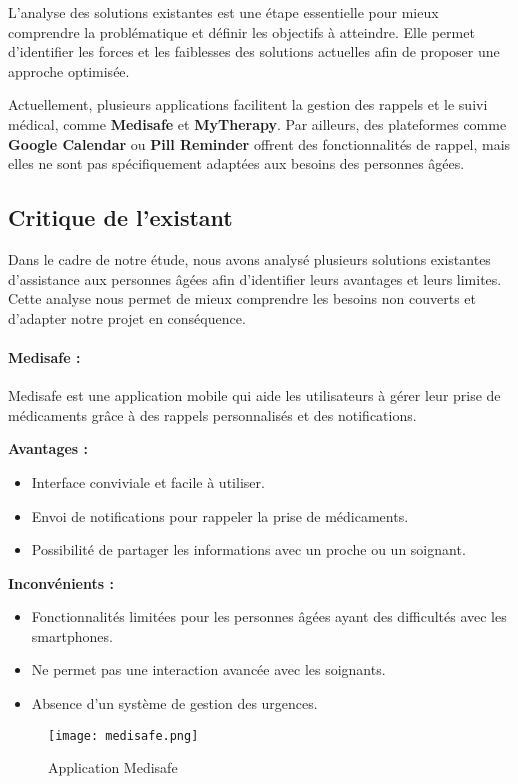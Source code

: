 \documentclass[12pt,a4paper]{report}
\begin{document}
L’analyse des solutions existantes est une étape essentielle pour mieux comprendre la problématique et définir les objectifs à atteindre. Elle permet d’identifier les forces et les faiblesses des solutions actuelles afin de proposer une approche optimisée.

Actuellement, plusieurs applications facilitent la gestion des rappels et le suivi médical, comme \textbf{Medisafe} et \textbf{MyTherapy}. Par ailleurs, des plateformes comme \textbf{Google Calendar} ou \textbf{Pill Reminder} offrent des fonctionnalités de rappel, mais elles ne sont pas spécifiquement adaptées aux besoins des personnes âgées.

\subsection{Critique de l’existant}

Dans le cadre de notre étude, nous avons analysé plusieurs solutions existantes d’assistance aux personnes âgées afin d’identifier leurs avantages et leurs limites. Cette analyse nous permet de mieux comprendre les besoins non couverts et d’adapter notre projet en conséquence.

\paragraph{Medisafe :}

Medisafe est une application mobile qui aide les utilisateurs à gérer leur prise de médicaments grâce à des rappels personnalisés et des notifications.

\textbf{Avantages :}
\begin{itemize}
    \item Interface conviviale et facile à utiliser.
    \item Envoi de notifications pour rappeler la prise de médicaments.
    \item Possibilité de partager les informations avec un proche ou un soignant.
\end{itemize}

\textbf{Inconvénients :}
\begin{itemize}
    \item Fonctionnalités limitées pour les personnes âgées ayant des difficultés avec les smartphones.
    \item Ne permet pas une interaction avancée avec les soignants.
    \item Absence d’un système de gestion des urgences.
\end{itemize}
\begin{figure}[H]
    \centering
    \texttt{[image: medisafe.png]}
    \caption{Application Medisafe}
    \label{fig:Medisafe}
\end{figure}
\end{document}
